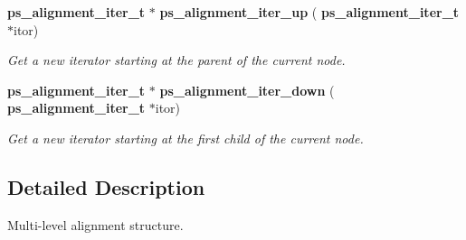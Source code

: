 \begin{DoxyCompactItemize}
\mbox{\label{ps__alignment_8c_ae546c5daf7bc78fe2924200b99187aa0}} 
\textbf{ ps\+\_\+alignment\+\_\+iter\+\_\+t} $\ast$ \textbf{ ps\+\_\+alignment\+\_\+iter\+\_\+up} (\textbf{ ps\+\_\+alignment\+\_\+iter\+\_\+t} $\ast$itor)
\begin{DoxyCompactList}\small\item\em Get a new iterator starting at the parent of the current node. \end{DoxyCompactList}\item 
\mbox{\label{ps__alignment_8c_a6356f643a01e2071c6f00f8a5d56565a}} 
\textbf{ ps\+\_\+alignment\+\_\+iter\+\_\+t} $\ast$ \textbf{ ps\+\_\+alignment\+\_\+iter\+\_\+down} (\textbf{ ps\+\_\+alignment\+\_\+iter\+\_\+t} $\ast$itor)
\begin{DoxyCompactList}\small\item\em Get a new iterator starting at the first child of the current node. \end{DoxyCompactList}\end{DoxyCompactItemize}


\subsection{Detailed Description}
Multi-\/level alignment structure. 

